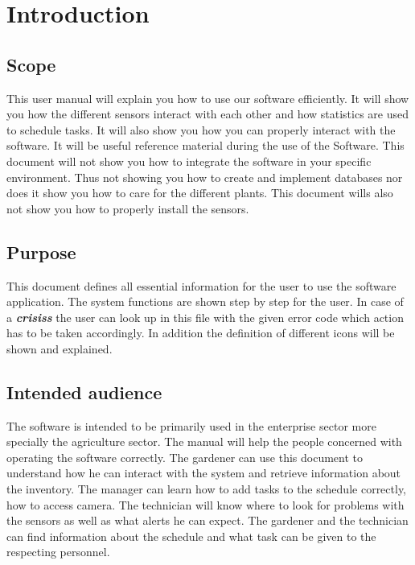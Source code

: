 \chapter{Introduction}
\label{chap:introduction}

\section{Scope}

This user manual will explain you how to use our software efficiently. It will
show you how the different sensors interact with each other and how statistics
are used to schedule tasks. It will also show you how you can properly interact
with the software. It will be useful reference material during the use of the
Software. This document will not show you how to integrate the software in your
specific environment. Thus not showing you how to create and implement databases
nor does it show you how to care for the different plants. This document wills
also not show you how to properly install the sensors.


\section{Purpose}

This document defines all essential information for the user to use the software application. 
The system functions are shown step by step for the user. In case of a
\textbf{\emph{\glspl{crisis}}} the user can look up in this file with the
given error code which action has to be taken accordingly.
In addition the definition of different icons will be shown and explained.


\section{Intended audience}

The software is intended to be primarily used in the enterprise sector more
specially the agriculture sector. The manual  will help the people concerned
with operating the software correctly. The gardener can use this document to
understand how he can interact with the system and retrieve information about
the inventory. The manager can learn how to add tasks to the schedule correctly,
how to access camera. The technician will know where to look for problems with
the sensors as well as what alerts he can expect. The gardener and the
technician can find information about the schedule and what task can be given to
the respecting personnel.

